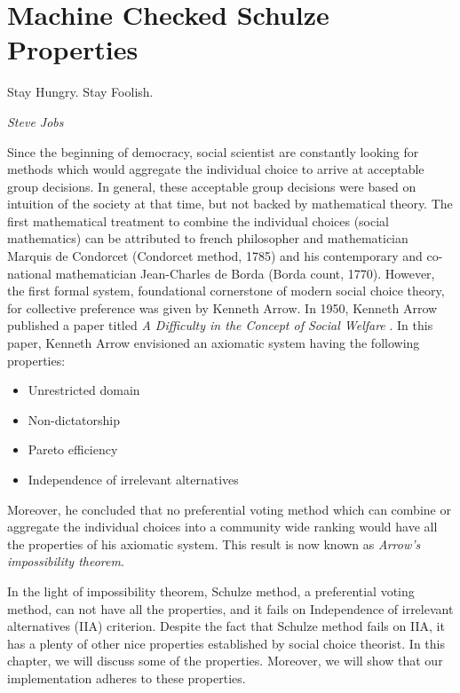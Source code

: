 \chapter{Machine Checked Schulze Properties}
\label{cha:machine_checked}

\epigraph{Stay Hungry. Stay Foolish.} 
{\textit{Steve Jobs}} 


 Since the beginning of democracy, social scientist are constantly looking for methods  which would 
 aggregate the individual choice  to arrive at acceptable group decisions. 
 In general, these acceptable group decisions were based on intuition of the society at that time,
 but not backed by mathematical theory. The first mathematical 
 treatment to combine the individual choices (social mathematics)  can be 
 attributed to french philosopher and mathematician Marquis de Condorcet (Condorcet method, 1785) and his contemporary
 and co-national mathematician Jean-Charles de Borda (Borda count, 1770). However, the first formal system, foundational cornerstone
 of modern social choice theory, for collective preference was given by Kenneth Arrow. In 1950, Kenneth Arrow 
 published a paper titled \textit{A Difficulty in the Concept of Social Welfare} \citep{arrow1950difficulty}. 
 In this paper, Kenneth Arrow envisioned an axiomatic system having the following properties:
 
 \begin{itemize}
 \item Unrestricted domain
 \item Non-dictatorship
 \item Pareto efficiency
 \item Independence of irrelevant alternatives
 \end{itemize}
 
 Moreover, he concluded that no preferential voting method which can combine or aggregate the individual choices into a community wide 
 ranking would have all the properties of his axiomatic system. This result is now known as \textit{Arrow's impossibility theorem}. 


 In the light of impossibility theorem, Schulze method, a preferential voting method, can not have all the properties, and it fails on 
 Independence of irrelevant alternatives (IIA) criterion. Despite the fact that Schulze method fails on IIA,  it has a plenty of other nice 
 properties established by social choice theorist. In this chapter, we will discuss some of 
 the properties.  Moreover, we will show that our implementation adheres to these properties. 
 
